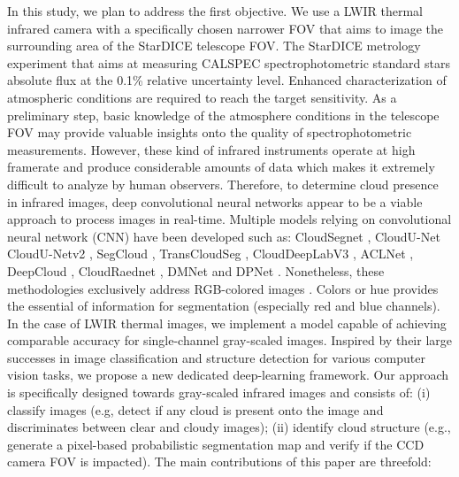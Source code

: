 \documentclass[amt, article]{copernicus}
\begin{document}
In this study, we plan to address the first objective. We use a LWIR thermal infrared camera with a specifically chosen narrower FOV that aims to image the surrounding area of the StarDICE telescope FOV. The StarDICE metrology experiment \citep{stardice1} that aims at measuring CALSPEC \citep{Bohlin2014} spectrophotometric standard stars absolute flux at the 0.1\% relative uncertainty level. Enhanced characterization of atmospheric conditions are required to reach the target sensitivity. As a preliminary step, basic knowledge of the atmosphere conditions in the telescope FOV may provide valuable insights onto the quality of spectrophotometric measurements. However, these kind of infrared instruments operate at high framerate and produce considerable amounts of data which makes it extremely difficult to analyze by human observers. Therefore, to determine cloud presence in infrared images, deep convolutional neural networks appear to be a viable approach to process images in real-time. Multiple models relying on convolutional neural network (CNN) have been developed such as: CloudSegnet \citep{dev2019cloudsegnet}, CloudU-Net \citep{CloudUNet} CloudU-Netv2 \citep{CloudUNetv2}, SegCloud \citep{SegCloud}, TransCloudSeg \citep{TransCloudSeg}, CloudDeepLabV3 \citep{CloudDeepLabV3}, ACLNet \citep{makwana2022aclnet}, DeepCloud \citep{DeepCloud}, CloudRaednet \citep{shi2022cloudraednet}, DMNet \citep{DMNet} and DPNet \cite{DPNet}. Nonetheless, these methodologies exclusively address RGB-colored images \citep{HYTA, dev2016colorbased}. Colors or hue provides the essential of information for segmentation (especially red and blue channels). In the case of LWIR thermal images, we implement a model capable of achieving comparable accuracy for single-channel gray-scaled images. Inspired by their large successes in image classification and structure detection for various computer vision tasks, we propose a new dedicated deep-learning framework. Our approach is specifically designed towards gray-scaled infrared images and consists of: (i) classify images (e.g, detect if any cloud is present onto the image and discriminates between clear and cloudy images); (ii) identify cloud structure (e.g., generate a pixel-based probabilistic segmentation map and verify if the CCD camera FOV is impacted).
The main contributions of this paper are threefold:

\end{document}
